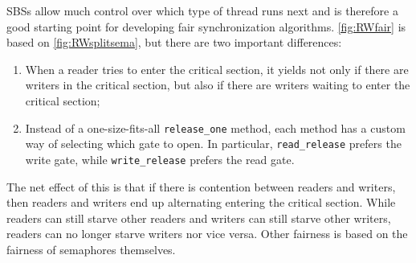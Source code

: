 \documentclass{report}
\newcommand{\harmonysource}[1]{
\begin{tabbing}
XX\=XXX\=XXX\kill
    
\end{tabbing}
}
\newcommand{\harmonylink}[1]{%
[\href{https://harmony.cs.cornell.edu/#1}{\underline{#1}}]%
}
\newenvironment{code}{
\tcolorbox
}{
\endtcolorbox
}
\begin{document}
SBSs allow much control over which type of thread runs next and is therefore
a good starting point for developing fair synchronization algorithms.
\autoref{fig:RWfair} is based on \autoref{fig:RWsplitsema}, but there
are two important differences:

\begin{enumerate}
\item When a reader tries to enter the critical section, it yields not only
if there are writers in the critical section, but also if there are writers
waiting to enter the critical section;
\item Instead of a one-size-fits-all \texttt{release\_one} method, each
method has a custom way of selecting which gate to open.  In particular,
\texttt{read\_release} prefers the write gate, while \texttt{write\_release}
prefers the read gate.
\end{enumerate}

The net effect of this is that if there is contention between readers and
writers, then readers and writers end up alternating entering the critical
section.  While readers can still starve other readers and writers can still
starve other writers, readers can no longer starve writers nor vice versa.
Other fairness is based on the fairness of semaphores themselves.

\end{document}
